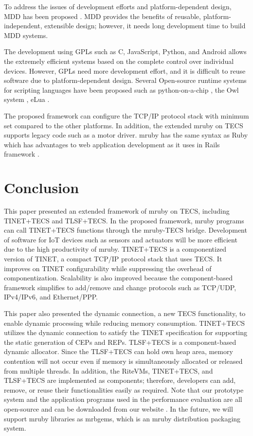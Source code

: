 \documentclass[a4j,12pt,oneside,openany,english]{jsbook}
\begin{document}
To address the issues of development efforts and platform-dependent design, MDD has been proposed \cite{par:MDD}.
MDD provides the benefits of reusable, platform-independent, extensible design; however, it needs long development time to build MDD systems.

The development using GPLs such as C, JavaScript, Python, and Android allows the extremely efficient systems based on the complete control over individual devices.
However, GPLs need more development effort, and it is difficult to reuse software due to platform-dependent design.
Several Open-source runtime systems for scripting languages have been proposed such as python-on-a-chip \cite{url:python-on-a-chip}, the Owl system \cite{par:owl}, eLua \cite{url:eLua}.

The proposed framework can configure the TCP/IP protocol stack with minimum set compared to the other platforms.
In addition, the extended mruby on TECS supports legacy code such as a motor driver.
mruby has the same syntax as Ruby which has advantages to web application development as it uses in Rails framework \cite{url:rubyonrails}.



\chapter{Conclusion}
\label{sec:Conclusion}

This paper presented an extended framework of mruby on TECS, including TINET+TECS and TLSF+TECS.
In the proposed framework, mruby programs can call TINET+TECS functions through the mruby-TECS bridge.
Development of software for IoT devices such as sensors and actuators will be more efficient due to the high productivity of mruby.
TINET+TECS is a componentized version of TINET, a compact TCP/IP protocol stack that uses TECS.
It improves on TINET configurability while suppressing the overhead of componentization.
Scalability is also improved because the component-based framework simplifies to add/remove and change protocols such as TCP/UDP, IPv4/IPv6, and Ethernet/PPP.

This paper also presented the dynamic connection, a new TECS functionality, to enable dynamic processing while reducing memory consumption.
TINET+TECS utilizes the dynamic connection to satisfy the TINET specification for supporting the static generation of CEPs and REPs.
TLSF+TECS is a component-based dynamic allocator.
Since the TLSF+TECS can hold own heap area, memory contention will not occur even if memory is simultaneously allocated or released from multiple threads.
In addition, the RiteVMs, TINET+TECS, and TLSF+TECS are implemented as components; therefore, developers can add, remove, or reuse their functionalities easily as required.
Note that our prototype system and the application programs used in the performance evaluation are all open-source and can be downloaded from our website \cite{url:TECS}.
In the future, we will support mruby libraries as mrbgems, which is an mruby distribution packaging system.
\end{document}
